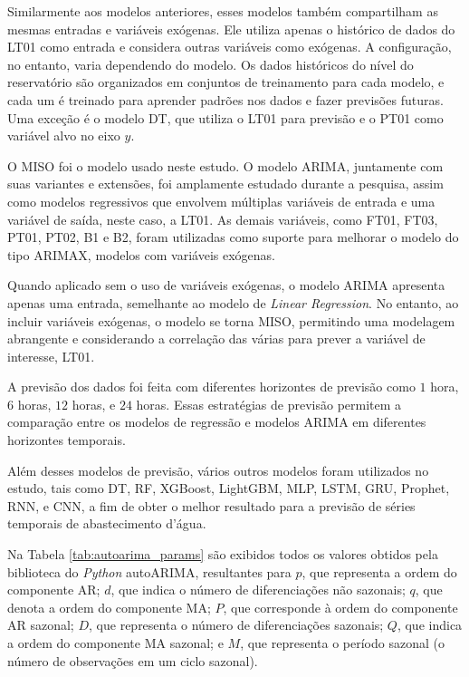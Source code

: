 Similarmente aos modelos anteriores, esses modelos também compartilham as mesmas entradas e variáveis exógenas. Ele utiliza apenas o histórico de dados do LT01 como entrada e considera outras variáveis como exógenas. A configuração, no entanto, varia dependendo do modelo. Os dados históricos do nível do reservatório são organizados em conjuntos de treinamento para cada modelo, e cada um é treinado para aprender padrões nos dados e fazer previsões futuras. Uma exceção é o modelo DT, que utiliza o LT01 para previsão e o PT01 como variável alvo no eixo $y$.


O MISO foi o modelo usado neste estudo. O modelo ARIMA, juntamente com suas variantes e extensões, foi amplamente estudado durante a pesquisa, assim como modelos regressivos que envolvem múltiplas variáveis de entrada e uma variável de saída, neste caso, a LT01. As demais variáveis, como FT01, FT03, PT01, PT02, B1 e B2, foram utilizadas como suporte para melhorar o modelo do tipo ARIMAX, modelos com variáveis exógenas.

Quando aplicado sem o uso de variáveis exógenas, o modelo ARIMA apresenta apenas uma entrada, semelhante ao modelo de \textit{Linear Regression}. No entanto, ao incluir variáveis exógenas, o modelo se torna MISO, permitindo uma modelagem  abrangente e considerando a correlação das várias para prever a variável de interesse, LT01.

A previsão dos dados foi feita com diferentes horizontes de previsão como $1$ hora, $6$ horas, $12$ horas, e $24$ horas. Essas estratégias de previsão permitem a comparação entre os modelos de regressão e modelos ARIMA em diferentes horizontes temporais.

Além desses modelos de previsão, vários outros modelos foram utilizados no estudo, tais como DT, RF, XGBoost, LightGBM, MLP, LSTM, GRU, Prophet, RNN, e CNN, a fim de obter o melhor resultado para a previsão de séries temporais de abastecimento d'água.


Na Tabela \ref{tab:autoarima_params} são exibidos todos os valores obtidos pela biblioteca do \textit{Python} autoARIMA, resultantes para $p$, que representa a ordem do componente AR; $d$, que indica o número de diferenciações não sazonais; $q$, que denota a ordem do componente MA; $P$, que corresponde à ordem do componente AR sazonal; $D$, que representa o número de diferenciações sazonais; $Q$, que indica a ordem do componente MA sazonal; e $M$, que representa o período sazonal (o número de observações em um ciclo sazonal).


